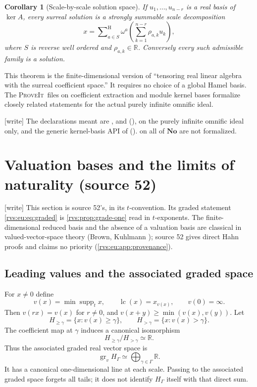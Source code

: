 \documentclass[11pt,letterpaper]{article}
\numberwithin{equation}{section}
\newtheorem{corollary}[theorem]{Corollary}
\theoremstyle{definition}
\theoremstyle{remark}
\newcommand{\No}{\mathbf{No}}
\newcommand{\R}{\mathbb{R}}
\newcommand{\supp}{\operatorname{supp}}
\newcommand{\gr}{\operatorname{gr}}
\newcommand{\lc}{\operatorname{lc}}
\newcommand{\HSum}{\mathop{\sum}\nolimits^{\mathrm H}}
\newcommand{\repo}{\textsc{ProveIt}}
\newcommand{\wtag}{\textup{[write]}}%
\begin{document}
\begin{corollary}[Scale-by-scale solution space]
If $u_1,\ldots,u_{n-r}$ is a real basis of $\ker A$, every surreal solution is
a strongly summable scale decomposition
\[
  x=\HSum_{a\in S}\omega^a
       \left(\sum_{k=1}^{n-r}\rho_{a,k}u_k\right),
\]
where $S$ is reverse well ordered and $\rho_{a,k}\in\R$. Conversely every such
admissible family is a solution.
\end{corollary}

This theorem is the finite-dimensional version of ``tensoring real linear algebra
with the surreal coefficient space.'' It requires no choice of a global Hamel
basis. The \repo\ files on coefficient extraction and module kernel bases formalize
closely related statements for the actual purely infinite omnific ideal.

\noindent\wtag{} The declarations meant are
,
 and
(), on the
purely infinite omnific ideal only, and the generic kernel-basis API of
 ().
 on all of
\(\No\) are not formalized.

\section{Valuation bases and the limits of naturality (source 52)}\label{rvs:w:sec:valuation}\label{rvs:eu:sec:valuation}\label{rvs:eu:sec:naturality}

\wtag{} This section is source 52's, in its \(t\)-convention.  Its graded
statement \eqref{rvs:eu:eq:graded} is \cref{rvs:prop:grade-one} read in
\(t\)-exponents.  The finite-dimensional reduced basis and the absence of a
valuation basis are classical in valued-vector-space theory (Brown,
Kuhlmann \cite{Kuhlmann}); source 52 gives direct Hahn proofs and claims no
priority (\cref{rvs:eu:app:provenance}).

\subsection{Leading values and the associated graded space}
For $x\ne0$ define
\[
 v(x)=\min\supp_t x,\qquad \lc(x)=x_{v(x)},\qquad v(0)=\infty.
\]
Then $v(rx)=v(x)$ for $r\ne0$, and $v(x+y)\ge\min(v(x),v(y))$. Let
\[
 H_{\ge\gamma}=\{x:v(x)\ge\gamma\},\qquad
 H_{>\gamma}=\{x:v(x)>\gamma\}.
\]
The coefficient map at $\gamma$ induces a canonical isomorphism
\begin{equation}\label{rvs:eu:eq:graded}
 H_{\ge\gamma}/H_{>\gamma}\simeq\R.
\end{equation}
Thus the associated graded real vector space is
\[
 \gr_vH_\Gamma\simeq\bigoplus_{\gamma\in\Gamma}\R.
\]
It has a canonical one-dimensional line at each scale. Passing to the associated graded space forgets all tails; it does not identify $H_\Gamma$ itself with that direct sum.
\end{document}
